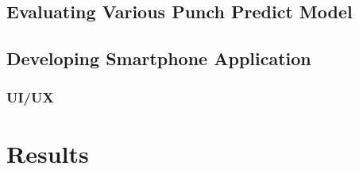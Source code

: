 \documentclass{article}
\begin{document}
\FloatBarrier
\subsection{Evaluating Various Punch Predict Model}











\subsection{Developing Smartphone Application}

\subsubsection{UI/UX}



\section{Results}
\end{document}
